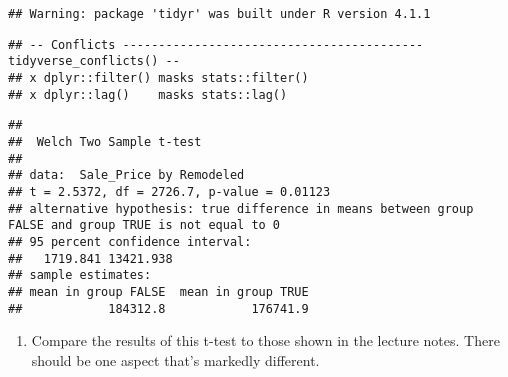 \documentclass[
]{article}
\newenvironment{Shaded}{\begin{snugshade}}{\end{snugshade}}
\newcommand{\AttributeTok}[1]{\textcolor[rgb]{0.77,0.63,0.00}{#1}}
\newcommand{\DecValTok}[1]{\textcolor[rgb]{0.00,0.00,0.81}{#1}}
\newcommand{\FloatTok}[1]{\textcolor[rgb]{0.00,0.00,0.81}{#1}}
\newcommand{\FunctionTok}[1]{\textcolor[rgb]{0.00,0.00,0.00}{#1}}
\newcommand{\NormalTok}[1]{#1}
\newcommand{\OtherTok}[1]{\textcolor[rgb]{0.56,0.35,0.01}{#1}}
\newcommand{\SpecialCharTok}[1]{\textcolor[rgb]{0.00,0.00,0.00}{#1}}
\providecommand{\tightlist}{%
  \setlength{\itemsep}{0pt}\setlength{\parskip}{0pt}}
\begin{document}
\begin{verbatim}
## Warning: package 'tidyr' was built under R version 4.1.1
\end{verbatim}

\begin{verbatim}
## -- Conflicts ------------------------------------------ tidyverse_conflicts() --
## x dplyr::filter() masks stats::filter()
## x dplyr::lag()    masks stats::lag()
\end{verbatim}

\begin{Shaded}
\end{Shaded}

\begin{verbatim}
## 
##  Welch Two Sample t-test
## 
## data:  Sale_Price by Remodeled
## t = 2.5372, df = 2726.7, p-value = 0.01123
## alternative hypothesis: true difference in means between group FALSE and group TRUE is not equal to 0
## 95 percent confidence interval:
##   1719.841 13421.938
## sample estimates:
## mean in group FALSE  mean in group TRUE 
##            184312.8            176741.9
\end{verbatim}

\begin{enumerate}
\def\labelenumi{\alph{enumi}.}
\setcounter{enumi}{1}
\tightlist
\item
  Compare the results of this t-test to those shown in the lecture
  notes. There should be one aspect that's markedly different.
\end{enumerate}
\end{document}
